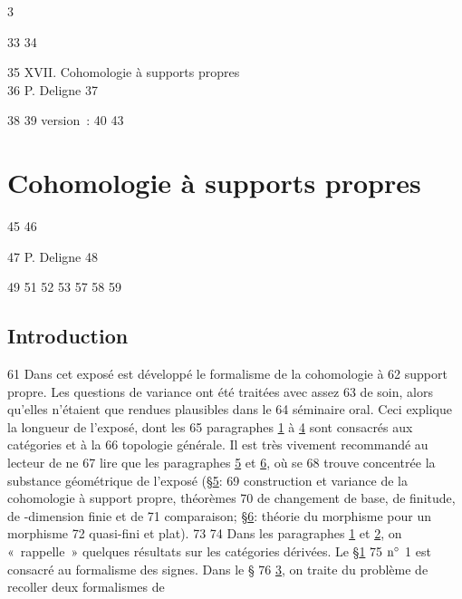 3	\documentclass[10pt]{../fichiers-configuration-latex/smfart}
\begin{document}
    33	
    34	\begin{center}
    35	XVII. Cohomologie à supports propres\\
    36	P. Deligne 
    37	\end{center}
    38	
    39	version : \showgitstatus{}
    40			
    43		\chapter{Cohomologie à supports propres}
    45	%
    46	\begin{center}
    47	P. Deligne 
    48	\end{center}
    49		
    51	\setcounter{pageoriginal}{251}
    52	
    53	
    57	
    58	
    59	\section*{Introduction}	
    61	Dans cet exposé est développé le formalisme de la cohomologie à
    62	support propre. Les questions de variance ont été traitées avec assez
    63	de soin, alors qu'elles n'étaient que rendues plausibles dans le
    64	séminaire oral. Ceci explique la longueur de l'exposé, dont les
    65	paragraphes \hyperref[XVII.sec1]{1} à \hyperref[XVII.sec4]{4} sont consacrés aux catégories et à la
    66	topologie générale. Il est très vivement recommandé au lecteur de ne
    67	lire que les paragraphes \hyperref[XVII.sec5]{5} et \hyperref[XVII.sec6]{6}, où se
    68	trouve concentrée la substance géométrique de l'exposé (\S \hyperref[XVII.sec5]{5}:
    69	construction et variance de la cohomologie à support propre, théorèmes
    70	de changement de base, de finitude, de \tTor-dimension finie et de
    71	comparaison; \S \hyperref[XVII.sec6]{6}: théorie du morphisme  pour un morphisme
    72	quasi-fini et plat).
    73	
    74	Dans les paragraphes \hyperref[XVII.sec1]{1} et \hyperref[XVII.sec2]{2}, on « rappelle » quelques résultats sur les catégories dérivées. Le \S \hyperref[XVII.sec1]{1}
    75	${\rm n^{\circ}}$ 1 est consacré au formalisme des signes. Dans le \S
    76	\hyperref[XVII.sec3]{3}, on traite du problème de recoller deux formalismes de
\end{document}
